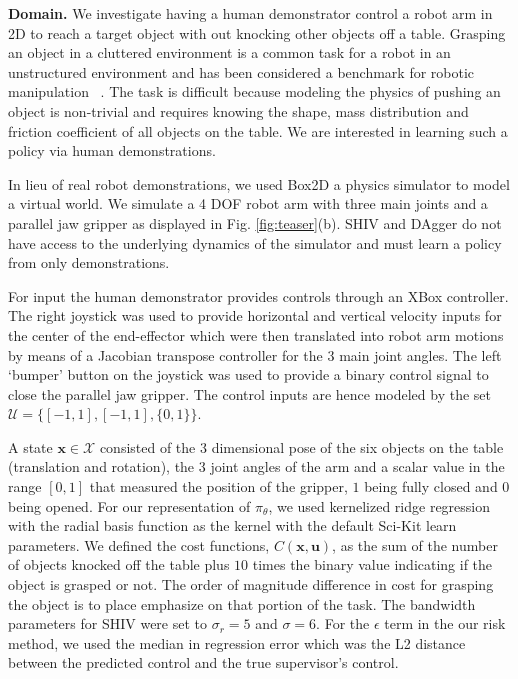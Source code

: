\documentclass[10pt, conference]{ieeeconf}      %
\newcommand{\bu}{\mathbf{u}}
\newcommand{\bx}{\mathbf{x}}
\begin{document}
\noindent\textbf{Domain.}
We investigate having a human demonstrator control a robot arm in 2D to reach a target object with out knocking other objects off a table. Grasping an object in a cluttered environment is a common task for a robot in an unstructured environment and has been considered a benchmark for robotic manipulation~ \cite{kitaevphysics,kingnonprehensile}. The task is difficult because modeling the physics of pushing an object is non-trivial and requires knowing the shape, mass distribution and friction coefficient of all objects on the table. We are interested in learning such a policy via human demonstrations. 

In lieu of real robot demonstrations, we used Box2D a physics simulator to model a virtual world. We simulate a 4 DOF robot arm with three main joints and a parallel jaw gripper as
displayed in Fig. \ref{fig:teaser}(b). SHIV and DAgger do not have access to the underlying dynamics of the simulator and must learn a policy from only demonstrations. 

For input the human demonstrator provides controls through an XBox controller. The right joystick was used to
    provide horizontal and vertical velocity inputs for the center of the end-effector which were then translated into
robot arm motions by means of a Jacobian transpose controller for the 3 main joint angles. The left `bumper' button on the joystick was used to provide a binary control signal to close the parallel jaw
gripper. The control inputs are hence modeled by the set $\mathcal{U} = \lbrace [-1,1],[-1,1],\lbrace 0,1 \rbrace \rbrace$.  

A state $\bx\in \mathcal{X}$ consisted of the 3 dimensional pose of the six objects on the table (translation and rotation), the 3 joint angles of the arm and a scalar value in the range $[0,1]$ that measured the position of the gripper, $1$ being fully closed and $0$ being opened. For our representation of $\pi_{\theta}$, we used kernelized ridge regression with the radial basis function as the kernel with the default Sci-Kit learn parameters. We defined the cost functions, $C(\bx,\bu)$, as the sum of the number of objects knocked off the table plus $10$ times the binary value indicating if the object is grasped or not. The order of magnitude difference in cost for grasping the object is to place emphasize on that portion of the task. The bandwidth parameters for SHIV were set to $\sigma_r = 5$ and $\sigma = 6$. For the $\epsilon$ term in the our risk method, we used the median in regression error which was the L2 distance between the predicted control and the true supervisor's control. 
\end{document}
